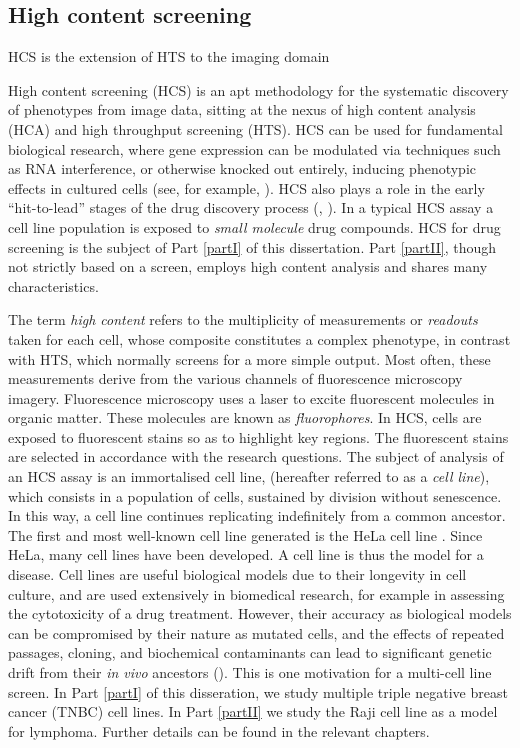 \subsection{High content screening}
\label{subsec:hcs}

HCS is the extension of HTS to the imaging domain

High content screening (HCS) is an apt methodology for the systematic discovery of phenotypes from image data, sitting at the nexus of high content analysis (HCA) and high throughput screening (HTS). HCS can be used for fundamental biological research, where gene expression can be modulated via techniques such as RNA interference, or otherwise knocked out entirely, inducing phenotypic effects in cultured cells (see, for example, \cite{neumann2010phenotypic}). HCS also plays a role in the early ``hit-to-lead'' stages of the drug discovery process (\cite{haney2006high}, \cite{pepperkok2006high}). In a typical HCS assay a cell line population is exposed to \emph{small molecule} drug compounds. HCS for drug screening is the subject of Part \ref{partI} of this dissertation. Part \ref{partII}, though not strictly based on a screen, employs high content analysis and shares many characteristics.

The term \emph{high content} refers to the multiplicity of measurements or \emph{readouts} taken for each cell, whose composite constitutes a complex phenotype, in contrast with HTS, which normally screens for a more simple output. Most often, these measurements derive from the various channels of fluorescence microscopy imagery. Fluorescence microscopy uses a laser to excite fluorescent molecules in organic matter. These molecules are known as \emph{fluorophores}. In HCS, cells are exposed to fluorescent stains so as to highlight key regions. The fluorescent stains are selected in accordance with the research questions. The subject of analysis of an HCS assay is an immortalised cell line, (hereafter referred to as a \emph{cell line}), which consists in a population of cells, sustained by division without senescence. In this way, a cell line continues replicating indefinitely from a common ancestor. The first and most well-known cell line generated is the HeLa cell line \cite{scherer1953studies}. Since HeLa, many cell lines have been developed. A cell line is thus the model for a disease. Cell lines are useful biological models due to their longevity in cell culture, and are used extensively in biomedical research, for example in assessing the cytotoxicity of a drug treatment. However, their accuracy as biological models can be compromised by their nature as mutated cells, and the effects of repeated passages, cloning, and biochemical contaminants can lead to significant genetic drift from their \emph{in vivo} ancestors (\cite{marx2014cell}). This is one motivation for a multi-cell line screen. In Part \ref{partI} of this disseration, we study multiple triple negative breast cancer (TNBC) cell lines. In Part \ref{partII} we study the Raji cell line as a model for lymphoma. Further details can be found in the relevant chapters.

